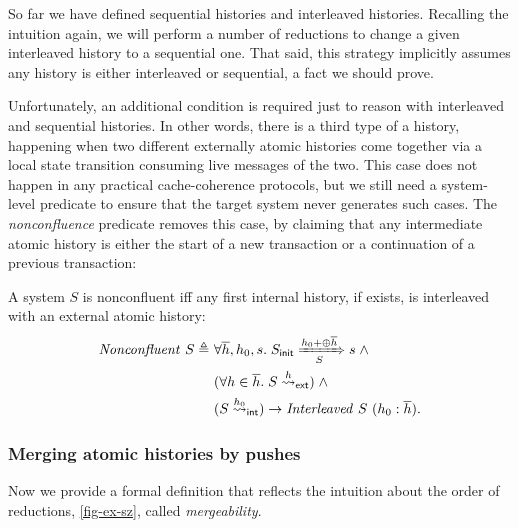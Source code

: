 \documentclass[sigplan,10pt,review,anonymous,screen]{acmart}\settopmatter{printfolios=true,printccs=false,printacmref=false}
\begin{document}
So far we have defined sequential histories and interleaved histories.
Recalling the intuition again, we will perform a number of reductions to change a given interleaved history to a sequential one.
That said, this strategy implicitly assumes any history is either interleaved or sequential, a fact we should prove.

Unfortunately, an additional condition is required just to reason with interleaved and sequential histories.
In other words, there is a third type of a history, happening when two different externally atomic histories come together via a local state transition consuming live messages of the two.
This case does not happen in any practical cache-coherence protocols, but we still need a system-level predicate to ensure that the target system never generates such cases.
The \emph{nonconfluence} predicate removes this case, by claiming that any intermediate atomic history is either the start of a new transaction or a continuation of a previous transaction:
\newcommand{\sncf}[1]{\ensuremath{\mathit{Nonconfluent}\ #1}}
\begin{definition}[Nonconfluence]
  A system $S$ is nonconfluent iff any first internal history, if exists, is
  interleaved with an external atomic history:
  \begin{align*}
    \sncf{S} \triangleq\ & \forall \listof{h}, h_0, s.\; \semsteps{S}{\sysInit{S}}{\listapp{h_0}{\listconcat{\listof{h}}}}{s} \; \land \\
    & (\forall h \in \listof{h}.\; \extatomicshort{S}{h}) \; \land \\
    & (\intatomicshort{S}{h_0}) \to \hitlv{S}{(\listcons{h_0}{\listof{h}})}.
  \end{align*}
\end{definition}

\subsubsection{Merging atomic histories by pushes}

\newcommand{\hmgb}[3]{\ensuremath{#1 \vdash #2 \hookrightarrow #3}}
\newcommand{\smgb}[1]{\ensuremath{\mathit{Mergeable}\ #1}}

Now we provide a formal definition that reflects the intuition about the order of reductions, \autoref{fig-ex-sz}, called \emph{mergeability}.
\end{document}
